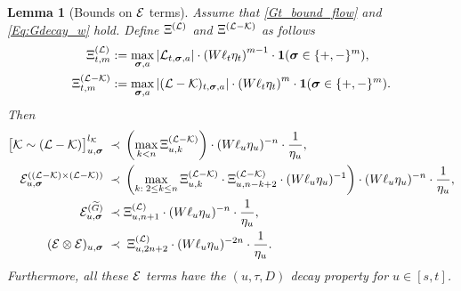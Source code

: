 \documentclass[10pt,reqno]{article}
\theoremstyle{plain} %
\newtheorem{lemma}[theorem]{Lemma}
\theoremstyle{remark}
\numberwithin{equation}{section}
\begin{document}
 \begin{lemma}[Bounds on $\cal E$ terms] \label{lem_BcalE} 
Assume  that \eqref{Gt_bound_flow} and \eqref{Eq:Gdecay_w} hold.  
Define $\Xi^{({\cal L})}$ and  $\Xi^{({\cal L}-{\cal K})}$ as follows
\begin{align}\label{def:XIL-K}
  \Xi^{({\cal L} )}_{t, m} &:= \max_{\boldsymbol{\sigma}, \textbf{a}} \left|{\cal L} _{t, \boldsymbol{\sigma}, \textbf{a}} \right|\cdot \left(W\ell_t \eta_t\right)^{m-1} \cdot {\bf 1}(\boldsymbol{\sigma} \in \{+, -\}^m),  
\\\nonumber
     \Xi^{({\cal L}-{\cal K})}_{t, m} &:= \max_{\boldsymbol{\sigma}, \textbf{a}} \left|({\cal L}-{\cal K})_{t, \boldsymbol{\sigma}, \textbf{a}} \right|\cdot \left(W\ell_t \eta_t\right)^{m} \cdot {\bf 1}(\boldsymbol{\sigma} \in \{+, -\}^m).
\end{align}
Then 
\begin{align}\label{CalEbwXi}
\big[\mathcal{K} \sim(\mathcal{L}-\mathcal{K})\big]_{u, \boldsymbol{\sigma}}^{l_{\mathcal{K}}}
   \; \prec \; &
   \left( \max_{k<n }\Xi^{(\cal L-\cal K)}_{u,k}\right)\cdot (W\ell_u\eta_u)^{-n }\cdot \frac{1}{\eta_u}  , 
   \nonumber \\
    \mathcal{E}_{u, \boldsymbol{\sigma}}^{((\mathcal{L} - \mathcal{K}) \times (\mathcal{L} - \mathcal{K}))}
    \; \prec \; &
   \left( \max_{k:\;2\le k\le n }\Xi^{(\cal L-\cal K)}_{u,k}\cdot \Xi^{(\cal L-\cal K)}_{u,n-k+2}\cdot(W\ell_u\eta_u)^{-1}\right)\cdot (W\ell_u\eta_u)^{-n }\cdot \frac{1}{\eta_u}  , 
  \nonumber \\  \mathcal{E}_{u, \boldsymbol{\sigma}}^{(\widetilde{G})}
 \; \prec \; &
     \Xi^{(\cal L)}_{u,n+1} \cdot (W\ell_u\eta_u)^{-n }\cdot \frac{1}{\eta_u}   ,  
  \nonumber \\   
(\mathcal{E} \otimes \mathcal{E}) _{u, \boldsymbol{\sigma}}
\; \prec \; &  \; \Xi^{(\cal L)}_{u, {2n+2}}\cdot   (W\ell_u\eta_u)^{-2n } \cdot \frac1{\eta_u}. 
\end{align}
Furthermore, 
all these  $\cal E$ terms have the $(u, \tau, D)$ decay property for  $u\in [s,t]$.  
 \end{lemma}
 
\end{document}
